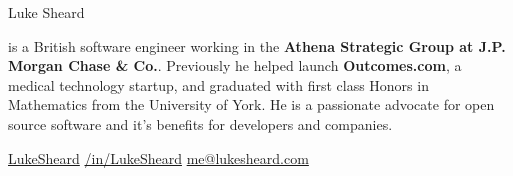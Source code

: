 {\Huge
  Luke Sheard
}

{\vspace{10pt}
  is a British software engineer working in the \textbf{Athena Strategic Group at J.P. Morgan Chase \& Co.}. 
  Previously he helped launch \textbf{Outcomes.com}, a medical technology startup, 
  and graduated with first class Honors in Mathematics from the University of York.
  He is a passionate advocate for open source software and it's benefits for developers and companies. 
}

\vspace{5pt}

\faGithub
\hspace{3pt}
\href{https://www.github.com/LukeSheard}{LukeSheard}
\hspace{20pt}
\faLinkedin
\hspace{3pt}
\href{http://www.linkedin.com/in/lukesheard}{/in/LukeSheard}
\hspace{20pt}
\faEnvelope
\hspace{3pt}
\href{mailto:me@lukesheard.com}{me@lukesheard.com}